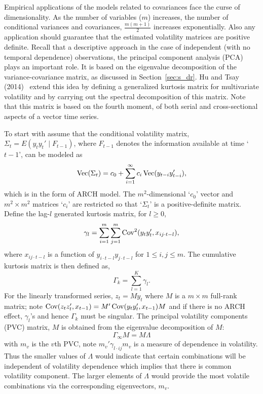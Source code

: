 Empirical applications of the models related to covariances face the curse of dimensionality. As the number of variables ($m$) increases, the number of conditional variances and covariances, $\frac{m(m+1)}{2}$ increases exponentially. Also any application should guarantee that the estimated volatility matrices are positive definite. Recall that a descriptive approach in the case of independent (with no temporal dependence) observations, the principal component analysis (PCA) plays an important role. It is based on the eigenvalue decomposition of the variance-covariance matrix, as discussed in Section~\ref{sec:s_dr}. Hu and Tsay (2014)~\cite{hutsay14} extend this idea by defining a generalized kurtosis matrix for multivariate volatility and by carrying out the spectral decomposition of this matrix. Note that this matrix is based on the fourth moment, of both serial and cross-sectional aspects of a vector time series.


To start with assume that the conditional volatility matrix, $\Sigma_t= E(y_ty_t' \;|\; F_{t-1})$, where $F_{t-1}$ denotes the information available at time `$t-1$', can be modeled as
	\begin{equation} \label{eqn:vtmodel}
	\tbvec(\Sigma_t)= c_0 + \sum_{i=1}^\infty c_i \tbvec(y_{t-i} y_{t-i}'),
	\end{equation}
which is in the form of ARCH model. The $m^2$-dimensional `$c_0$' vector and $m^2 \times m^2$ matrices `$c_i$' are restricted so that `$\Sigma_t$' is a positive-definite matrix. Define the lag-$l$ generated kurtosis matrix, for $l \geq 0$,
	\begin{equation} \label{eqn:kurtosismat}
	\gamma_l = \sum_{i=1}^m \sum_{j=1}^m \cov^2(y_t y_t', x_{ij \cdot t - l} ),
	\end{equation}
where $x_{ij \cdot t - l}$ is a function of $y_{i \cdot t-l} y_{j \cdot t-l}$ for $1 \leq i,j \leq m$. The cumulative kurtosis matrix is then defined as,
	\begin{equation} \label{eqn:cumkurt}
	\Gamma_k= \sum_{l=1}^K \gamma_l.
	\end{equation}
For the linearly transformed series, $z_t= My_t$ where $M$ is a $m \times m$ full-rank matrix; note $\operatorname{Cov}(z_tz_t', x_{t-1})=M' \operatorname{Cov}(y_ty_t', x_{t-1}) M$ and if there is no ARCH effect, $\gamma_l$'s and hence $\Gamma_k$ must be singular. The principal volatility components (PVC) matrix, $M$ is obtained from the eigenvalue decomposition of $M$:
	\begin{equation} \label{eqn:obtainM}
	\Gamma_\infty M= M \Lambda
	\end{equation}
with $m_v$ is the $v$th PVC, note $m_v' \gamma_{l \cdot ij} m_v$ is a measure of dependence in volatility. Thus the smaller values of $\Lambda$ would indicate that certain combinations will be independent of volatility dependence which implies that there is common volatility component. The larger elements of $\Lambda$ would provide the most volatile combinations via the corresponding eigenvectors, $m_v$. 



